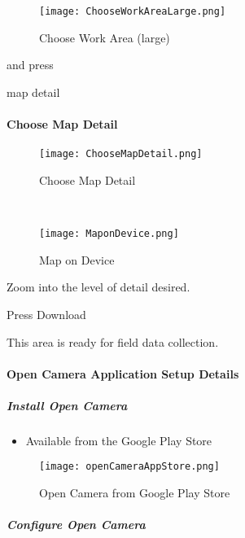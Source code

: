 \documentclass[class=book , crop=false, titlepage, twoside, multi={itemize, figure, verbatim}, float=false]{standalone}
\begin{document}
\vspace{.2in}

\clearpage
%
%
%
\begin{wrapfigure}{r}{0.5\textwidth}
\centering
\texttt{[image: ChooseWorkAreaLarge.png]}
\caption{Choose Work Area (large)}
\end{wrapfigure}

\vspace{.2in}

and press
\vspace{.2in}

map detail

\vspace{.2in}

\clearpage
%
%
%
\paragraph[Choose Map Detail]{Choose Map Detail\texorpdfstring{\\}{}}

%
%
\begin{wrapfigure}{r}{0.5\textwidth}
\centering
\texttt{[image: ChooseMapDetail.png]}
\caption{Choose Map Detail}
\vspace{.25in}

\HRule \\[.4cm] %
\vspace{.25in}

\texttt{[image: MaponDevice.png]}
\caption{Map on Device}
\end{wrapfigure}
Zoom into the level of detail desired.
\vspace{.5in}

\noindent Press Download
\vspace{3.5in}

\noindent This area is ready for field data collection.
\clearpage
%
%
%
\paragraph{Open Camera Application Setup Details}

\subparagraph{Install Open Camera}
\begin{itemize}
\item Available from the Google Play Store
\end{itemize}
%
%
\begin{figure}[h!]
\centering
    \texttt{[image: openCameraAppStore.png]}
\caption{Open Camera from Google Play Store}
\end{figure}
\clearpage
%
%
%
\subparagraph{Configure Open Camera}
\end{document}

